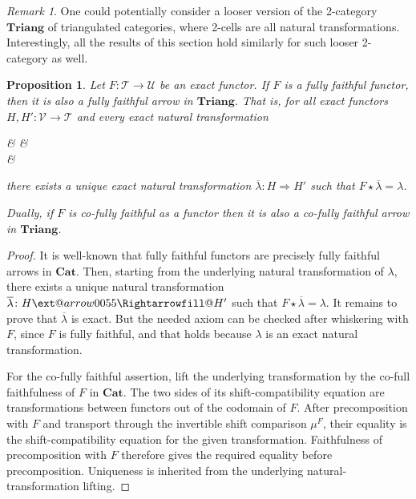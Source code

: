 \documentclass[11pt,reqno,a4paper]{amsart}
\makeatletter
\newtheorem{proposition}[theorem]{Proposition}
\theoremstyle{definition}
\theoremstyle{remark}
\newtheorem{remark}[theorem]{Remark}
\newcommand{\T}{\mathcal{T}}
\newcommand{\U}{\mathcal{U}}
\newcommand{\V}{\mathcal{V}}
\newcommand{\0}{\mathbf{0}}
\renewcommand{\1}{\mathbf{1}}
\newcommand{\Cat}{\mathbf{Cat}}
\newcommand{\Triang}{\mathbf{Triang}}
\def\:{\colon}
\newcommand{\aR}[2][]{
	\ext@arrow 0055{\Rightarrowfill@}{#1}{#2}}
\makeatother
\begin{document}
\begin{remark}
    One could potentially consider a looser version of the 2-category $\Triang$ of triangulated categories, where 2-cells are all natural transformations. Interestingly, all the results of this section hold similarly for such looser 2-category as well.
\end{remark}

\begin{proposition}\label{propffinCatisffinTriang}
    Let $F\:\T\to \U$ be an exact functor. If $F$ is a fully faithful functor, then it is also a fully faithful arrow in $\Triang$. That is, for all exact functors $H,H'\: \mathcal{V} \to \T$ and every exact natural transformation
\begin{cd}[4.5][4.5]
\V  \& \T \arrow[d, Rightarrow, "\lambda", shorten <= -0.5ex, shorten <= -0.5ex] \& \U \\[-3ex]
	\& \T
	\arrow[from=1-1, to=1-2,"H"]
	\arrow[from=1-1, to=2-2, bend right=20,"{H'}"']
	\arrow[from=1-2, to=1-3,"F"]
	\arrow[from=2-2, to=1-3, bend right=20,"F"']
\end{cd}
  there exists a unique exact natural transformation $\overline{\lambda}\: H \Rightarrow H'$ such that $F \star \overline{\lambda} = \lambda$.

  Dually, if $F$ is co-fully faithful as a functor then it is also a co-fully faithful arrow in $\Triang$.
\end{proposition}
\begin{proof}
    It is well-known that fully faithful functors are precisely fully faithful arrows in $\Cat$. Then, starting from the underlying natural transformation of $\lambda$, there exists a unique natural transformation $\overline{\lambda}\:H\aR{}H'$ such that $F\star \overline{\lambda}=\lambda$. It remains to prove that $\overline{\lambda}$ is exact. But the needed axiom can be checked after whiskering with $F$, since $F$ is fully faithful, and that holds because $\lambda$ is an exact natural transformation.

    For the co-fully faithful assertion, lift the underlying transformation by the co-full faithfulness of $F$ in $\Cat$. The two sides of its shift-compatibility equation are transformations between functors out of the codomain of $F$. After precomposition with $F$ and transport through the invertible shift comparison $\mu^F$, their equality is the shift-compatibility equation for the given transformation. Faithfulness of precomposition with $F$ therefore gives the required equality before precomposition. Uniqueness is inherited from the underlying natural-transformation lifting.
\end{proof}
\end{document}
